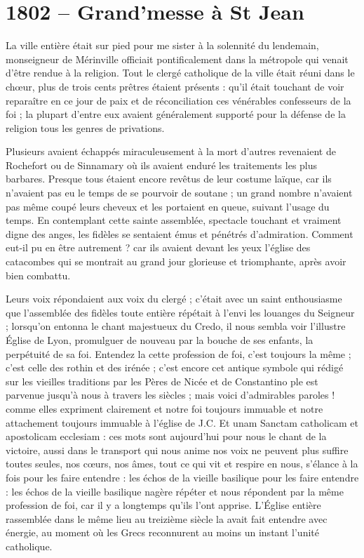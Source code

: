 \documentclass[11pt,a4paper]{report}
\begin{document}
\section*{1802 -- Grand'messe à St Jean}

La ville entière était sur pied pour me sister à la solennité du lendemain, monseigneur de Mérinville officiait pontificalement dans la métropole qui venait d'être rendue à la religion. Tout le clergé catholique de la ville était réuni dans le chœur, plus de trois cents prêtres étaient présents : qu'il était touchant de voir reparaître en ce jour de paix et de réconciliation ces vénérables confesseurs de la foi ; la plupart d'entre eux avaient généralement supporté pour la défense de la religion tous les genres de privations.

Plusieurs avaient échappés miraculeusement à la mort d'autres revenaient de Rochefort ou de Sinnamary où ils avaient enduré les traitements les plus barbares. Presque tous étaient encore revêtus de leur costume laïque, car ils n'avaient pas eu le temps de se pourvoir de soutane ; un grand nombre n'avaient pas même coupé leurs cheveux et les portaient en queue, suivant l'usage du temps. En contemplant cette sainte assemblée, spectacle touchant et vraiment digne des anges, les fidèles se sentaient émus et pénétrés d'admiration. Comment eut-il pu en être autrement ? car ils avaient devant les yeux l'église des catacombes qui se montrait au grand jour glorieuse et triomphante, après avoir bien combattu.

Leurs voix répondaient aux voix du clergé ; c'était avec un saint enthousiasme que l'assemblée des fidèles toute entière répétait à l'envi les louanges du Seigneur ; lorsqu'on entonna le chant majestueux du Credo, il nous sembla voir l'illustre Église de Lyon, promulguer de nouveau par la bouche de ses enfants, la perpétuité de sa foi. Entendez la cette profession de foi, c'est toujours la même ; c'est celle des rothin et des irénée ; c'est encore cet antique symbole qui rédigé sur les vieilles traditions par les Pères de Nicée et de Constantino ple est parvenue jusqu'à nous à travers les siècles ; mais voici d'admirables paroles ! comme elles expriment clairement et notre foi toujours immuable et notre attachement toujours immuable à l'église de J.C. Et unam Sanctam catholicam et apostolicam ecclesiam : ces mots sont aujourd'hui pour nous le chant de la victoire, aussi dans le transport qui nous anime nos voix ne peuvent plus suffire toutes seules, nos cœurs, nos âmes, tout ce qui vit et respire en nous, s'élance à la fois pour les faire entendre : les échos de la vieille basilique pour les faire entendre : les échos de la vieille basilique nagère répéter et nous répondent par la même profession de foi, car il y a longtemps qu'ils l'ont apprise. L'Église entière rassemblée dans le même lieu au treizième siècle la avait fait entendre avec énergie, au moment où les Grecs reconnurent au moins un instant l'unité catholique.
\end{document}

